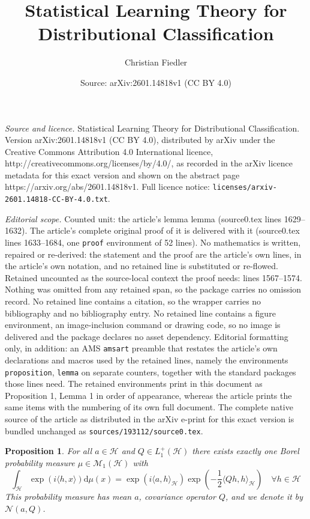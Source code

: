 \documentclass[10pt,a4paper]{amsart}
\title{Statistical Learning Theory for Distributional Classification}
\author{Christian Fiedler}
\date{Source: arXiv:2601.14818v1 (CC BY 4.0)}
\newtheorem{proposition}{Proposition}
\newcommand{\Normal}{\mathcal{N}}
\newcommand{\distributions}{\mathcal{M}_1} %
\newcommand{\hs}[1]{\mathcal{#1}} %
\begin{document}
\maketitle

\noindent\emph{Source and licence.} Statistical Learning Theory for Distributional Classification. Version arXiv:2601.14818v1 (CC BY 4.0), distributed by arXiv under the Creative Commons Attribution 4.0 International licence, http://creativecommons.org/licenses/by/4.0/, as recorded in the arXiv licence metadata for this exact version and shown on the abstract page https://arxiv.org/abs/2601.14818v1. Full licence notice: \texttt{licenses/arxiv-2601.14818-CC-BY-4.0.txt}.\par\smallskip

\noindent\textit{Editorial scope.} Counted unit: the article's lemma lemma (source0.tex lines 1629--1632). The article's complete original proof of it is delivered with it (source0.tex lines 1633--1684, one \texttt{proof} environment of 52 lines). No mathematics is written, repaired or re-derived: the statement and the proof are the article's own lines, in the article's own notation, and no retained line is substituted or re-flowed.  Retained uncounted as the source-local context the proof needs: lines 1567--1574.  Nothing was omitted from any retained span, so the package carries no omission record.  No retained line contains a citation, so the wrapper carries no bibliography and no bibliography entry.  No retained line contains a figure environment, an image-inclusion command or drawing code, so no image is delivered and the package declares no asset dependency.  Editorial formatting only, in addition: an AMS \texttt{amsart} preamble that restates the article's own declarations and macros used by the retained lines, namely the environments \texttt{proposition}, \texttt{lemma} on separate counters, together with the standard packages those lines need.  The retained environments print in this document as Proposition 1, Lemma 1 in order of appearance, whereas the article prints the same items with the numbering of its own full document.  The complete native source of the article as distributed in the arXiv e-print for this exact version is bundled unchanged as \texttt{sources/193112/source0.tex}.
\begin{proposition} \label{prop:gaussian:existenceUniquenessFourier}
For all $a\in\hs{H}$ and $Q\in L_1^+(\hs{H})$ there exists exactly one Borel probability measure $\mu\in\distributions(\hs{H})$ with
\begin{equation}
    \int_\hs{H} \exp(i\langle h,x\rangle) \mathrm{d}\mu(x) = \exp(i\langle a, h\rangle_\hs{H})\exp\left(-\frac12 \langle Qh, h\rangle_\hs{H}\right)
    \quad \forall h\in\hs{H}
\end{equation}
This probability measure has mean $a$, covariance operator $Q$, and we denote it by $\Normal(a,Q)$.
\end{proposition}
\end{document}
